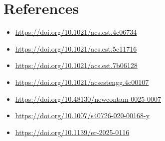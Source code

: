 \documentclass{article}
\begin{document}
\section{References}
\begin{itemize}
  \item \url{https://doi.org/10.1021/acs.est.4c06734}
  \item \url{https://doi.org/10.1021/acs.est.5c11716}
  \item \url{https://doi.org/10.1021/acs.est.7b06128}
  \item \url{https://doi.org/10.1021/acsestengg.4c00107}
  \item \url{https://doi.org/10.48130/newcontam-0025-0007}
  \item \url{https://doi.org/10.1007/s40726-020-00168-y}
  \item \url{https://doi.org/10.1139/er-2025-0116}
\end{itemize}
\end{document}
